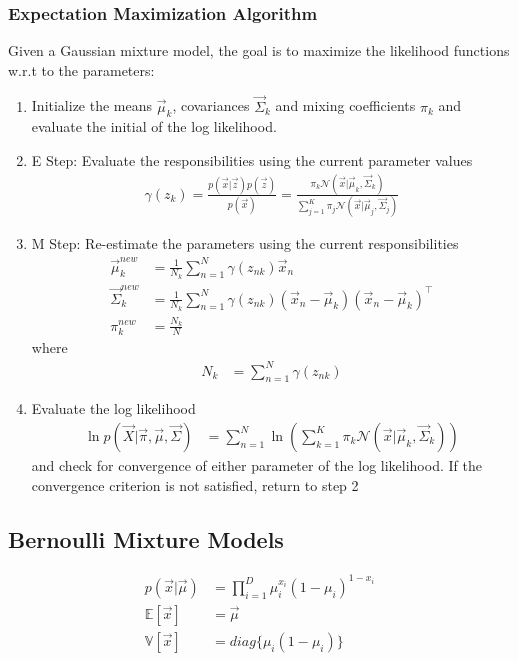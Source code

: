 \documentclass[12pt,twoside]{article}
\begin{document}
\subsubsection{Expectation Maximization Algorithm}
Given a Gaussian mixture model, the goal is to maximize the likelihood functions w.r.t to the parameters:
\begin{enumerate}
	\item Initialize the means $\vec{\mu}_k$, covariances $\vec{\Sigma}_k$ and mixing coefficients $\pi_k$ and evaluate the initial of the log likelihood.
	\item E Step: Evaluate the responsibilities using the current parameter values
		\begin{align*}
			\gamma (z_k) = \frac{p(\vec{x}\vert \vec{z})p(\vec{z})}{p(\vec{x})} = \frac{\pi_k \mathcal{N}(\vec{x}\vert \vec{\mu}_k, \vec{\Sigma}_k) }	{\sum_{j=1}^K \pi_j\mathcal{N}(\vec{x}\vert \vec{\mu}_j, \vec{\Sigma}_j)}
		\end{align*}
	\item M Step: Re-estimate the parameters using the current responsibilities
		\begin{align*}
			\vec{\mu}_k^{new}&=\frac{1}{N_k}\sum_{n=1}^N \gamma(z_{nk})\vec{x}_n\\
			\vec{\Sigma}_k^{new}&=\frac{1}{N_k}\sum_{n=1}^N \gamma(z_{nk})(\vec{x}_n-\vec{\mu}_k)(\vec{x}_n-\vec{\mu}_k)^\top\\
			\pi_k^{new}&=\frac{N_k}{N}
		\end{align*}
	where
		\begin{align*}
			N_k & = \sum_{n=1}^N \gamma(z_{nk})
		\end{align*}
	\item Evaluate the log likelihood
		\begin{align*}
			\ln p(\vec{X} \vert \vec{\pi}, \vec{\mu}, \vec{\Sigma})&=\sum_{n=1}^N \ln\left(\sum_{k=1}^K \pi_k\mathcal{N}(\vec{x}\vert \vec{\mu}_k, 		\vec{\Sigma}_k)\right)
	\end{align*}
	and check for convergence of either parameter of the log likelihood. If the convergence criterion is not satisfied, return to step 2
\end{enumerate}


\subsection{Bernoulli Mixture Models}

\begin{align*}
p(\vec{x}\vert \vec{\mu}) & = \prod_{i=1}^D \mu_i^{x_i}(1-\mu_i)^{1-x_i}\\
\mathbb{E}[\vec{x}] & = \vec{\mu}\\
\mathbb{V}[\vec{x}] &= diag\lbrace \mu_i(1-\mu_i)\rbrace
\end{align*}
\end{document}
